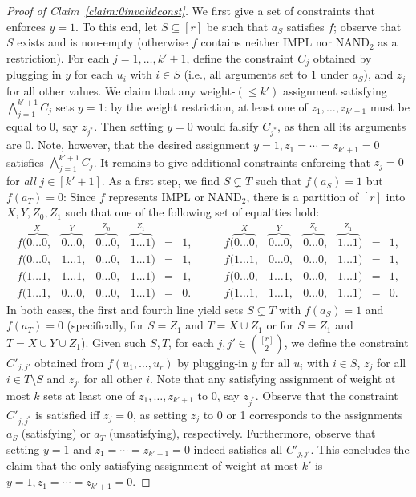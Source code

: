 \documentclass[10pt,a4paper]{article}
\theoremstyle{plain}
\newcommand{\NAND}{\mathrm{NAND}}
\newcommand{\Impl}{\mathrm{IMPL}}
\newcommand{\entry}[1]{#1 \dots #1}
\begin{document}
\begin{proof}[Proof of Claim~\ref{claim:0invalidconst}]
%
We first give a set of constraints that enforces $y=1$. To this end, let $S\subseteq [r]$ be such that $a_S$ satisfies $f$; observe that $S$ exists and is non-empty (otherwise $f$ contains neither $\Impl$ nor $\NAND_{2}$ as a restriction). For each $j=1,\dots,k'+1$, define the constraint $C_j$ obtained by plugging in $y$ for each $u_i$ with $i\in S$ (i.e., all arguments set to $1$ under $a_S$), and $z_j$ for all other values. We claim that any weight-$(\le k')$ assignment satisfying $\bigwedge_{j=1}^{k'+1} C_j$ sets $y=1$: by the weight restriction, at least one of $z_{1},\dots,z_{k'+1}$ must be equal to $0$, say $z_{j^*}$. Then setting $y=0$ would falsify $C_{j^*}$, as then all its arguments are $0$. Note, however, that the desired assignment $y=1, z_1=\cdots=z_{k'+1}=0$ satisfies $\bigwedge_{j=1}^{k'+1} C_j$.
%
It remains to give additional constraints enforcing that $z_j = 0$ for \emph{all} $j\in [k'+1]$. As a first step, we find $S\subsetneq T$ such that $f(a_S)=1$ but $f(a_T)= 0$: Since $f$ represents $\Impl$ or $\NAND_2$, there is a partition of $[r]$ into $X, Y, Z_0, Z_1$ such that one of the following set of equalities hold:
\[
\begin{matrix}
f( \overbrace{\entry{0}}^{X},& \overbrace{\entry{0}}^{Y}, & \overbrace{\entry{0}}^{Z_0}, & \overbrace{\entry{1}}^{Z_1}) & = & 1,\\
f( \entry{0},& \entry{1}, & \entry{0}, & \entry{1}) & = & 1,\\
f( \entry{1},& \entry{1}, & \entry{0}, & \entry{1}) & = & 1,\\
  \hline
f( \entry{1},& \entry{0}, & \entry{0}, & \entry{1}) & = & 0.
\end{matrix}
\qquad 
\begin{matrix}
f( \overbrace{\entry{0}}^{X},& \overbrace{\entry{0}}^{Y}, & \overbrace{\entry{0}}^{Z_0}, & \overbrace{\entry{1}}^{Z_1}) & = & 1,\\
f( \entry{1},& \entry{0}, & \entry{0}, & \entry{1}) & = & 1,\\
f( \entry{0},& \entry{1}, & \entry{0}, & \entry{1}) & = & 1,\\
  \hline
f( \entry{1},& \entry{1}, & \entry{0}, & \entry{1}) & = & 0.
\end{matrix}
\]
In both cases, the first and fourth line yield sets $S \subsetneq T$ with $f(a_S)=1$ and $f(a_T)=0$ (specifically, for $S=Z_1$ and $T=X \cup Z_1$ or for $S=Z_1$ and $T=X \cup Y \cup Z_1$).
%
Given such $S,T$, for each $j,j' \in {[r] \choose 2}$, we define the constraint $C'_{j,j'}$ obtained from $f(u_1,\dots,u_r)$ by plugging-in $y$ for all $u_i$ with $i\in S$, $z_j$ for all $i\in T\setminus S$ and $z_{j'}$ for all other $i$. Note that any satisfying assignment of weight at most $k$ sets at least one of $z_1,\dots, z_{k'+1}$ to $0$, say $z_{j^*}$. Observe that the constraint $C'_{j,j^*}$ is satisfied iff $z_j=0$, as setting $z_j$ to 0 or 1 corresponds to the assignments $a_S$ (satisfying) or $a_T$ (unsatisfying), respectively. Furthermore, observe that setting $y=1$ and $z_1=\cdots = z_{k'+1}=0$ indeed satisfies all $C'_{j,j'}$.
This concludes the claim that the only satisfying assignment of weight at most $k'$ is $y=1, z_1=\cdots = z_{k'+1} = 0$.
\end{proof}
%
%
\end{document}
